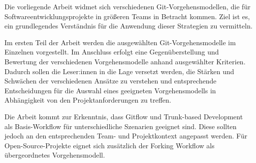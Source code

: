 
Die vorliegende Arbeit widmet sich verschiedenen Git\hyp Vorgehensmodellen, die für Softwareentwicklungsprojekte in größeren Teams in Betracht kommen. Ziel ist es, ein grundlegendes Verständnis für die Anwendung dieser Strategien zu vermitteln.

Im ersten Teil der Arbeit werden die ausgewählten Git\hyp Vorgehensmodelle im Einzelnen vorgestellt. Im Anschluss erfolgt eine Gegenüberstellung und Bewertung der verschiedenen Vorgehensmodelle anhand ausgewählter Kriterien. Dadurch sollen die Leser:innen in die Lage versetzt werden, die Stärken und Schwächen der verschiedenen Ansätze zu verstehen und entsprechende Entscheidungen für die Auswahl eines geeigneten Vorgehensmodells in Abhängigkeit von den Projektanforderungen zu treffen.

Die Arbeit kommt zur Erkenntnis, dass Gitflow und Trunk\hyp based Development als Basis\hyp Workflow für unterschiedliche Szenarien geeignet sind. Diese sollten jedoch an den entsprechenden Team- und Projektkontext angepasst werden. Für Open\hyp Source\hyp Projekte eignet sich zusätzlich der Forking Workflow als übergeordnetes Vorgehensmodell.
